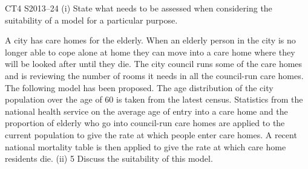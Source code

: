 \documentclass[a4paper,12pt]{article}
\begin{document}
\begin{enumerate}

CT4 S2013–24
(i)
State what needs to be assessed when considering the suitability of a model for
a particular purpose.

A city has care homes for the elderly. When an elderly person in the city is no longer
able to cope alone at home they can move into a care home where they will be looked
after until they die.
The city council runs some of the care homes and is reviewing the number of rooms it needs in all the council-run care homes. The following model has been proposed.
The age distribution of the city population over the age of 60 is taken from the latest census. Statistics from the national health service on the average age of entry into a
care home and the proportion of elderly who go into council-run care homes are applied to the current population to give the rate at which people enter care homes. A
recent national mortality table is then applied to give the rate at which care home residents die.
(ii)
5
Discuss the suitability of this model.




\end{enumerate}
\end{document}

